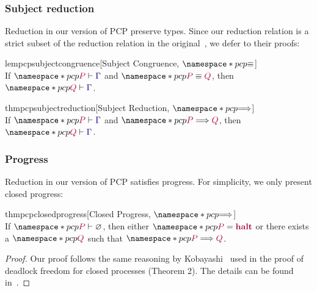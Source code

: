 \documentclass[main.tex]{subfiles}
\begin{document}



\subsubsection*{Subject reduction}
Reduction in our version of PCP preserve types. Since our reduction relation is a strict subset of the reduction relation in the original~\cite{dardhagay18}, we defer to their proofs:
\begin{restatablelemma}{lempcpsubjectcongruence}[Subject Congruence, $\pcp{\equiv}$]
  \label{lem:pcp-subject-congruence}
  \hfill\\%
  If $\pcp{\seq{P}{\ty{\Gamma}}}$ and $\pcp{\tm{P}\equiv\tm{Q}}$,
  then $\pcp{\seq{Q}{\ty{\Gamma}}}$.
\end{restatablelemma}
\begin{restatabletheorem}{thmpcpsubjectreduction}[Subject Reduction, $\pcp{\red}$]
  \label{thm:pcp-subject-reduction}
  \hfill\\%
  If $\pcp{\seq{P}{\ty{\Gamma}}}$ and $\pcp{\tm{P}\red\tm{Q}}$, then $\pcp{\seq{Q}{\ty{\Gamma}}}$.
\end{restatabletheorem}

\subsubsection*{Progress}
Reduction in our version of PCP satisfies progress. For simplicity, we only present closed progress:
\begin{restatabletheorem}{thmpcpclosedprogress}[Closed Progress, $\pcp{\red}$]
  \label{thm:pcp-closed-progress}
  \hfill\\%
  If $\pcp{\seq{P}{\emptyenv}}$, then either $\pcp{\tm{P}=\tm{\halt}}$ or there exists a $\pcp{\tm{Q}}$ such that $\pcp{\tm{P}\red\tm{Q}}$.
\end{restatabletheorem}
\begin{proof}
    Our proof follows the same reasoning by Kobayashi~\cite{kobayashi06} used in the proof of deadlock freedom for closed processes (Theorem 2). The details can be found in~.
\end{proof}
\end{document}
